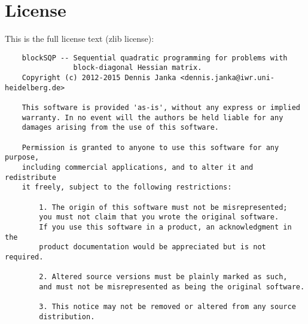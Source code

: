 \documentclass[	11pt,
				a4paper,
				abstract=true,
				twoside=true,
				bibliography=totoc, 
				headinclude=true,
				footinclude=false]{scrartcl}
\begin{document}
\section{License\label{sec:license}}
This is the full license text (zlib license):
\begin{verbatim}
    blockSQP -- Sequential quadratic programming for problems with
                block-diagonal Hessian matrix.
    Copyright (c) 2012-2015 Dennis Janka <dennis.janka@iwr.uni-heidelberg.de>

    This software is provided 'as-is', without any express or implied
    warranty. In no event will the authors be held liable for any
    damages arising from the use of this software.

    Permission is granted to anyone to use this software for any purpose,
    including commercial applications, and to alter it and redistribute
    it freely, subject to the following restrictions:

        1. The origin of this software must not be misrepresented;
        you must not claim that you wrote the original software.
        If you use this software in a product, an acknowledgment in the
        product documentation would be appreciated but is not required.

        2. Altered source versions must be plainly marked as such,
        and must not be misrepresented as being the original software.

        3. This notice may not be removed or altered from any source
        distribution.
\end{verbatim}
\end{document}
